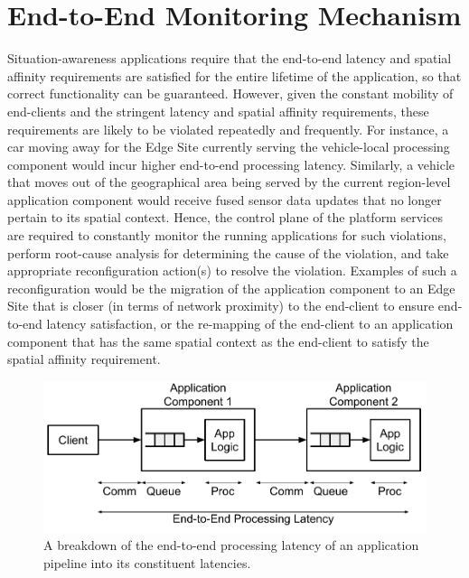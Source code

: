 \section{End-to-End Monitoring Mechanism}
Situation-awareness applications require that the end-to-end latency and spatial affinity requirements are satisfied for the entire lifetime of the application, so that correct functionality can be guaranteed. However, given the constant mobility of end-clients and the stringent latency and spatial affinity requirements, these requirements are likely to be violated repeatedly and frequently. For instance, a car moving away for the Edge Site currently serving the vehicle-local processing component would incur higher end-to-end processing latency. Similarly, a vehicle that moves out of the geographical area being served by the current region-level application component would receive fused sensor data updates that no longer pertain to its spatial context. Hence, the control plane of the platform services are required to constantly monitor the running applications for such violations, perform root-cause analysis for determining the cause of the violation, and take appropriate reconfiguration action(s) to resolve the violation. Examples of such a reconfiguration would be the migration of the application component to an Edge Site that is closer (in terms of network proximity) to the end-client to ensure end-to-end latency satisfaction, or the re-mapping of the end-client to an application component that has the same spatial context as the end-client to satisfy the spatial affinity requirement.
\begin{figure}
\centering
\includegraphics[width=0.75\linewidth]{figures/mechanisms/monitoring/pipeline_latencies}
\caption{A breakdown of the end-to-end processing latency of an application pipeline into its constituent latencies.}
\label{fig:pipeline_latencies}
\end{figure}

